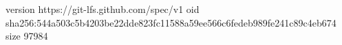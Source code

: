 version https://git-lfs.github.com/spec/v1
oid sha256:544a503c5b4203be22dde823fc11588a59ee566c6fedeb989fe241c89c4eb674
size 97984
